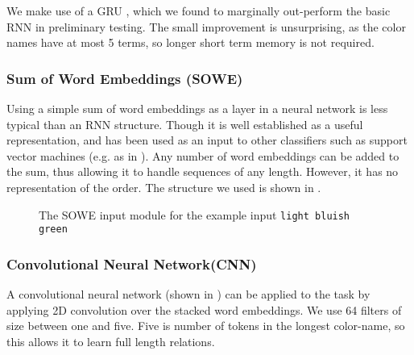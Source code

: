 \documentclass[]{clv3}
\newcommand{\parencite}{\citep}
\newcommand{\textcite}{\citet}
\newcommand{\natlang}[1]{\texttt{#1}}
\begin{document}
We make use of a GRU \parencite{cho2014properties},
which we found to marginally out-perform the basic RNN in preliminary testing.
The small improvement is unsurprising, as the color names have at most 5 terms,
so longer short term memory is not required.


\subsubsection{Sum of Word Embeddings (SOWE)}\label{sec:sowemod}
Using a simple sum of word embeddings as a layer in a neural network is less typical than an RNN structure.
Though it is well established as a useful representation, and has been used as an input to other classifiers such as support vector machines (e.g. as in \textcite{White2015SentVecMeaning,novelperspective}).
Any number of word embeddings can be added to the sum, thus allowing it to handle sequences of any length.
However, it has no representation of the order.
The structure we used is shown in .

\begin{figure}
	
	\caption{The SOWE input module for the example input \natlang{light bluish green}}
	\label{fig:sowemod}
\end{figure}



\subsubsection{Convolutional Neural Network(CNN)}\label{sec:cnnmod}
A convolutional neural network (shown in ) can be applied to the task by applying 2D convolution over the stacked word embeddings.
We use 64 filters of size between one and five.
Five is number of tokens in the longest color-name,
so this allows it to learn full length relations.
\end{document}
